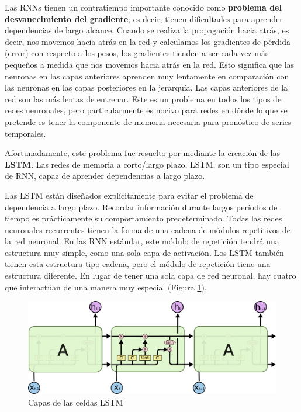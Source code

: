 \documentclass[]{book}
\begin{document}
Las RNNs tienen un contratiempo importante conocido como
\textbf{problema del desvanecimiento del gradiente}; es decir, tienen
dificultades para aprender dependencias de largo alcance. Cuando se
realiza la propagación hacia atrás, es decir, nos movemos hacia atrás en
la red y calculamos los gradientes de pérdida (error) con respecto a los
pesos, los gradientes tienden a ser cada vez más pequeños a medida que
nos movemos hacia atrás en la red. Esto significa que las neuronas en
las capas anteriores aprenden muy lentamente en comparación con las
neuronas en las capas posteriores en la jerarquía. Las capas anteriores
de la red son las más lentas de entrenar. Este es un problema en todos
los tipos de redes neuronales, pero particularmente es nocivo para redes
en dónde lo que se pretende es tener la componente de memoria necesaria
para pronóstico de series temporales.

Afortunadamente, este problema fue resuelto por
\citep{hochreiter1997long} mediante la creación de las \textbf{LSTM}.
Las redes de memoria a corto/largo plazo, LSTM, son un tipo especial de
RNN, capaz de aprender dependencias a largo plazo.

Las LSTM están diseñados explícitamente para evitar el problema de
dependencia a largo plazo. Recordar información durante largos períodos
de tiempo es prácticamente su comportamiento predeterminado. Todas las
redes neuronales recurrentes tienen la forma de una cadena de módulos
repetitivos de la red neuronal. En las RNN estándar, este módulo de
repetición tendrá una estructura muy simple, como una sola capa de
activación. Los LSTM también tienen esta estructura tipo cadena, pero el
módulo de repetición tiene una estructura diferente. En lugar de tener
una sola capa de red neuronal, hay cuatro que interactúan de una manera
muy especial (Figura \ref{fig:LSTM-chain}).

\begin{figure}[H]

{\centering \includegraphics[width=0.6\linewidth]{images/LSTM3-chain} 

}

\caption{Capas de las celdas LSTM}\label{fig:LSTM-chain}
\end{figure}
\end{document}

